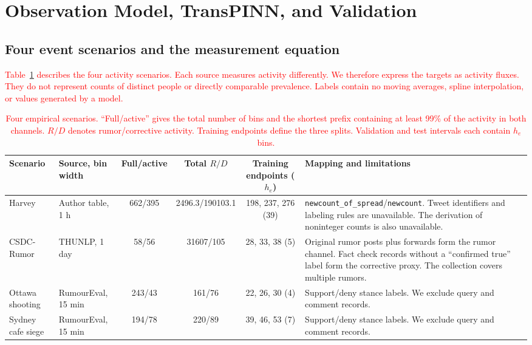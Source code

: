 \documentclass[letterpaper,journal]{IEEEtran}
\begin{document}
\section{Observation Model, TransPINN, and Validation}\label{sec3}

\subsection{Four event scenarios and the measurement equation}

\textcolor{red}{
Table~\ref{tab:event_data} describes the four activity scenarios. Each source measures activity differently. We therefore express the targets as activity fluxes. They do not represent counts of distinct people or directly comparable prevalence. Labels contain no moving averages, spline interpolation, or values generated by a model.
}

\begin{table}[t]
	\caption{\textcolor{red}{Four empirical scenarios. ``Full/active'' gives the total number of bins and the shortest prefix containing at least 99\% of the activity in both channels. $R/D$ denotes rumor/corrective activity. Training endpoints define the three splits. Validation and test intervals each contain $h_e$ bins.}}
	\label{tab:event_data}
	\centering\scriptsize
	\begin{tabularx}{\textwidth}{@{}l l c c c X@{}}
	\toprule
	Scenario & Source, bin width & Full/active & Total $R/D$ & Training endpoints ($h_e$) & Mapping and limitations\\
	\midrule
	Harvey & Author table, 1 h & 662/395 & 2496.3/190103.1 & 198, 237, 276 (39) & \texttt{newcount\_of\_spread}/\texttt{newcount}. Tweet identifiers and labeling rules are unavailable. The derivation of noninteger counts is also unavailable.\\
	CSDC-Rumor & THUNLP, 1 day & 58/56 & 31607/105 & 28, 33, 38 (5) & Original rumor posts plus forwards form the rumor channel. Fact check records without a ``confirmed true'' label form the corrective proxy. The collection covers multiple rumors.\\
	Ottawa shooting & RumourEval, 15 min & 243/43 & 161/76 & 22, 26, 30 (4) & Support/deny stance labels. We exclude query and comment records.\\
	Sydney cafe siege & RumourEval, 15 min & 194/78 & 220/89 & 39, 46, 53 (7) & Support/deny stance labels. We exclude query and comment records.\\
	\bottomrule
	\end{tabularx}
\end{table}
\end{document}
